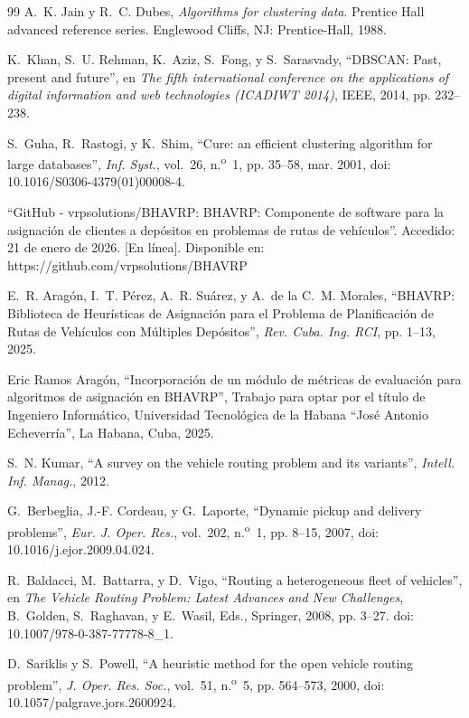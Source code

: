 \begin{thebibliography}{99}
 A.~K. Jain y R.~C. Dubes, \emph{Algorithms for clustering data}. Prentice Hall advanced reference series. Englewood Cliffs, NJ: Prentice-Hall, 1988.

 K.~Khan, S.~U. Rehman, K.~Aziz, S.~Fong, y S.~Sarasvady, ``DBSCAN: Past, present and future'', en \emph{The fifth international conference on the applications of digital information and web technologies (ICADIWT 2014)}, IEEE, 2014, pp. 232--238.

 S.~Guha, R.~Rastogi, y K.~Shim, ``Cure: an efficient clustering algorithm for large databases'', \emph{Inf. Syst.}, vol.~26, n.\textsuperscript{o}~1, pp. 35--58, mar. 2001, doi: 10.1016/S0306-4379(01)00008-4.

 ``GitHub - vrpsolutions/BHAVRP: BHAVRP: Componente de software para la asignaci\'on de clientes a dep\'ositos en problemas de rutas de veh\'iculos''. Accedido: 21 de enero de 2026. [En l\'inea]. Disponible en: https://github.com/vrpsolutions/BHAVRP

 E.~R. Arag\'on, I.~T. P\'erez, A.~R. Su\'arez, y A.~de la C.~M. Morales, ``BHAVRP: Biblioteca de Heur\'isticas de Asignaci\'on para el Problema de Planificaci\'on de Rutas de Veh\'iculos con M\'ultiples Dep\'ositos'', \emph{Rev. Cuba. Ing. RCI}, pp. 1--13, 2025.

 Eric Ramos Arag\'on, ``Incorporaci\'on de un m\'odulo de m\'etricas de evaluaci\'on para algoritmos de asignaci\'on en BHAVRP'', Trabajo para optar por el t\'itulo de Ingeniero Inform\'atico, Universidad Tecnol\'ogica de la Habana ``Jos\'e Antonio Echeverr\'ia'', La Habana, Cuba, 2025.

 S.~N. Kumar, ``A survey on the vehicle routing problem and its variants'', \emph{Intell. Inf. Manag.}, 2012.

 G.~Berbeglia, J.-F. Cordeau, y G.~Laporte, ``Dynamic pickup and delivery problems'', \emph{Eur. J. Oper. Res.}, vol.~202, n.\textsuperscript{o}~1, pp. 8--15, 2007, doi: 10.1016/j.ejor.2009.04.024.

 R.~Baldacci, M.~Battarra, y D.~Vigo, ``Routing a heterogeneous fleet of vehicles'', en \emph{The Vehicle Routing Problem: Latest Advances and New Challenges}, B.~Golden, S.~Raghavan, y E.~Wasil, Eds., Springer, 2008, pp. 3--27. doi: 10.1007/978-0-387-77778-8\_1.

 D.~Sariklis y S.~Powell, ``A heuristic method for the open vehicle routing problem'', \emph{J. Oper. Res. Soc.}, vol.~51, n.\textsuperscript{o}~5, pp. 564--573, 2000, doi: 10.1057/palgrave.jors.2600924.


\end{thebibliography}
